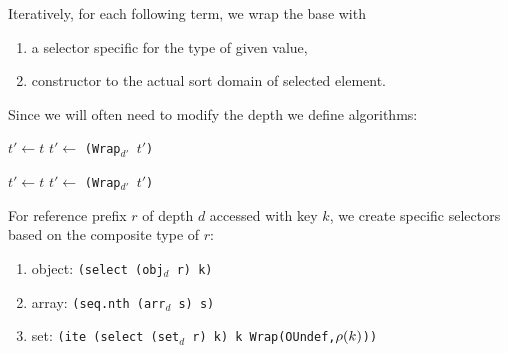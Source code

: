 Iteratively, for each following term, we wrap the base with
\begin{enumerate}
  \item a selector specific for the type of given value,
  \item constructor to the actual sort domain of selected element.
\end{enumerate}

Since we will often need to modify the depth we define algorithms:
\begin{center}
  \begin{minipage}{0.44\textwidth}
    \begin{algorithm}[H]
      \caption{Wrap(t,d)}\label{alg:wrap}
    \BlankLine
    $t' \leftarrow t$\;
     {
    }
     {
      $t' \leftarrow$ \texttt{(Wrap$_{d'}$ $t'$)}
    }
    \end{algorithm}
  \end{minipage}
  \hfill
  \begin{minipage}{0.44\textwidth}
    \begin{algorithm}[H]
      \caption{Unwrap(t,d)}\label{alg:unwrap}
    \BlankLine
    $t' \leftarrow t$\;
     {
      $t' \leftarrow$ \texttt{(Wrap$_{d'}$ $t'$)} 
    }
    \end{algorithm}
  \end{minipage}
\end{center}


For reference prefix $r$ of depth $d$ accessed with key $k$, we create specific selectors based on the composite type of $r$:
\begin{enumerate}
  \item object: \texttt{(select (obj$_d$ r) k)}
  \item array: \texttt{(seq.nth (arr$_d$ s) s)}
  \item set: \texttt{(ite (select (set$_d$ r) k) k \texttt{Wrap(OUndef,$\rho(k)$)})}
\end{enumerate}

